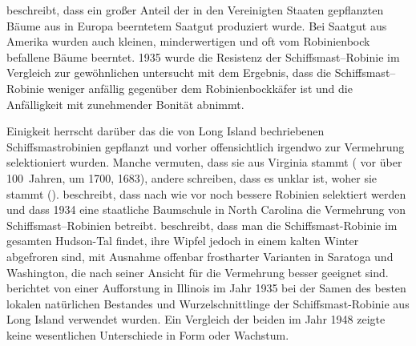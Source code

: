 \documentclass[twocolumn]{scrartcl}
\begin{document}
\citet{hall1937robinie} beschreibt, dass ein großer Anteil der in den
Vereinigten Staaten gepflanzten Bäume aus in Europa beerntetem Saatgut
produziert wurde. Bei Saatgut aus Amerika wurden auch kleinen,
minderwertigen und oft vom Robinienbock befallene Bäume beerntet. 1935
wurde die Resistenz der Schiffsmast--Robinie im Vergleich zur
gewöhnlichen untersucht mit dem Ergebnis, dass die
Schiffsmast--Robinie weniger anfällig gegenüber dem Robinienbockkäfer
ist und die Anfälligkeit mit zunehmender Bonität abnimmt.

Einigkeit herrscht darüber das die von Long Island
bechriebenen Schiffsmastrobinien gepflanzt und vorher offensichtlich
irgendwo zur Vermehrung selektioniert wurden. Manche vermuten, dass sie
aus Virginia stammt (\citet{hicks1883robinie} vor über 100~Jahren,
\citet{raber1936shipmast} um 1700, \citet{detwiler1937robinie} 1683),
andere schreiben, dass es unklar ist, woher sie stammt
(\citet{raber1938robinie}). \citet{detwiler1937robinie} beschreibt,
dass nach wie vor noch bessere Robinien selektiert werden und dass
1934 eine staatliche Baumschule in North Carolina die Vermehrung von
Schiffsmast--Robinien betreibt.
\citet{cope1938robinie} beschreibt, dass man die Schiffsmast-Robinie im
gesamten Hudson-Tal findet, ihre Wipfel jedoch in einem kalten Winter
abgefroren sind, mit Ausnahme offenbar frostharter Varianten in
Saratoga und Washington, die nach seiner Ansicht für die Vermehrung
besser geeignet sind.
\citet{minckler1948robinie} berichtet von einer Aufforstung in Illinois
im Jahr 1935 bei der Samen des besten lokalen natürlichen Bestandes
und Wurzelschnittlinge der Schiffsmast-Robinie aus Long Island
verwendet wurden. Ein Vergleich der beiden im Jahr 1948 zeigte keine
wesentlichen Unterschiede in Form oder Wachstum.
\end{document}
